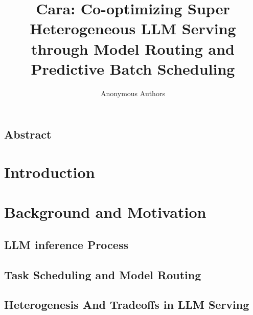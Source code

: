 \documentclass[letterpaper, anonymous, twocolumn, 10pt]{article}
\begin{document}
\date{}

\title{\Large \bf Cara: Co-optimizing Super Heterogeneous LLM Serving through Model Routing and Predictive Batch Scheduling}

\author{
{\rm Anonymous Authors}
}

\maketitle



\subsection*{Abstract}


\section{Introduction} \label{section:introduction}


\section{Background and Motivation} \label{section:motivation}

\subsection{LLM inference Process} \label{section:llm_inference_processes}
\subsection{Task Scheduling and Model Routing}

\subsection{Heterogenesis And Tradeoffs in LLM Serving}\label{section:heterogenity}
\end{document}
